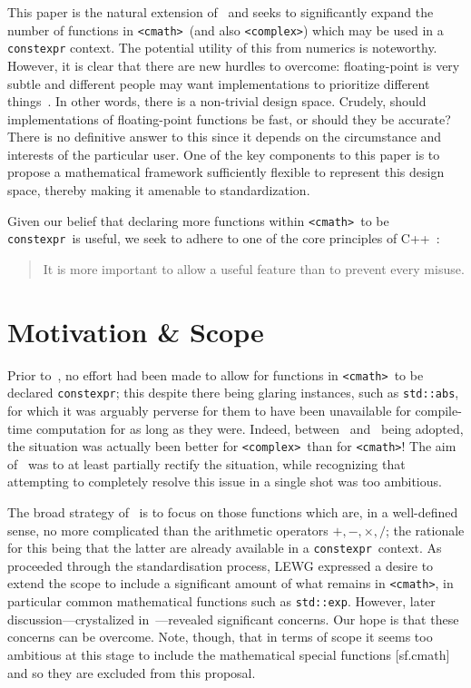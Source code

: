 \documentclass[prd,twocolumn,amsmath,amssymb,nofootinbib,eqsecnum]{revtex4-1}
\newcommand{\constexpr}{\code{constexpr}\xspace}
\newcommand{\code}[1]{{\tt #1}}
\newcommand{\header}[1]{{\tt <#1>}}
\newcommand{\cmath}{\header{cmath}}
\newcommand{\complex}{\header{complex}}
\newcommand{\Operators}{\ensuremath{+,-,\times,/}}
\begin{document}
This paper is the natural extension of~\cite{Rosten-constexpr} and seeks to significantly expand the number of functions in \cmath\ (and also \complex) which may be used in a \constexpr context. The potential utility of this from numerics is noteworthy. However, it is clear that there are new hurdles to overcome: floating-point is very subtle and different people may want implementations to prioritize different things~\cite{Timmons-Less}. In other words, there is a non-trivial design space. Crudely, should implementations of floating-point functions be fast, or should they be accurate? There is no definitive answer to this since it depends on the circumstance and interests of the particular user. One of the key components to this paper is to propose a mathematical framework sufficiently flexible to represent this design space, thereby making it amenable to standardization.

Given our belief that declaring more functions within \cmath\ to be \constexpr\ is useful, we seek to adhere to one of the core principles of C++~\cite{DandE}:
\begin{quote}
	It is more important to allow a useful feature than to prevent every misuse.
\end{quote}

\section{Motivation \& Scope}

Prior to~\cite{Rosten-constexpr}, no effort had been made to allow for functions in \cmath\ to be declared \constexpr; this despite there being glaring instances, such as \code{std::abs}, for which it was arguably perverse for them to have been unavailable for compile-time computation for as long as they were. Indeed, between~\cite{AP-complex} and~\cite{Rosten-constexpr} being adopted, the situation was actually been better for \complex\ than for \cmath! The aim of~\cite{Rosten-constexpr} was to at least partially rectify the situation, while recognizing that attempting to completely resolve this issue in a single shot was too ambitious.

The broad strategy of~\cite{Rosten-constexpr} is to focus on those functions which are, in a well-defined sense, no more complicated than the arithmetic operators \Operators; the rationale for this being that the latter are already available in a \constexpr\ context.
As~\cite{Rosten-constexpr} proceeded through the standardisation process, LEWG expressed a desire 
to extend the scope to include a significant amount of what remains in \cmath, in particular common mathematical functions such as \code{std::exp}. However, later discussion---crystalized in~\cite{Timmons-Less}---revealed significant concerns. Our hope is that these concerns can be overcome. Note, though, that in terms of scope it seems too ambitious at this stage to include the mathematical special functions [sf.cmath] and so they are excluded from this proposal.
\end{document}
